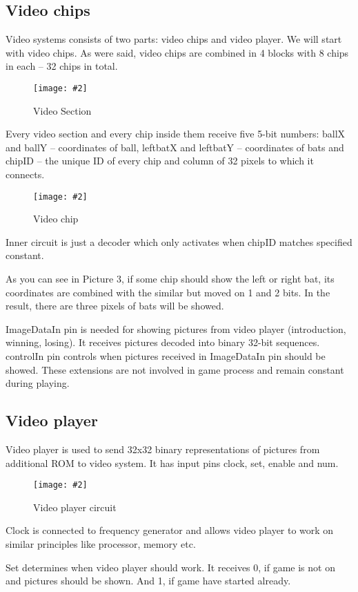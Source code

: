 \documentclass[12pt,a4paper]{article}
\newcommand{\dofigure}[3][H]{
    \begin{figure}[#1]
        \centering
        \texttt{[image: \#2]}
        \caption{#3}
    \end{figure}
}
\begin{document}
    \subsection{Video chips}
    Video systems consists of two parts: video chips and video player. We will start with video chips. As were said, video chips are combined in 4 blocks with 8 chips in each – 32 chips in total. 

    \dofigure{video_section.png}{Video Section}
    Every video section and every chip inside them receive five 5-bit numbers: ballX and ballY – coordinates of ball, leftbatX and leftbatY – coordinates of bats and chipID – the unique ID of every chip and column of 32 pixels to which it connects.
    \dofigure{video_chip.png}{Video chip}

    Inner circuit is just a decoder which only activates when chipID matches specified constant.

    As you can see in Picture 3, if some chip should show the left or right bat, its coordinates are combined with the similar but moved on 1 and 2 bits. In the result, there are three pixels of bats will be showed.
    
    ImageDataIn pin is needed for showing pictures from video player (introduction, winning, losing). It receives pictures decoded into binary 32-bit sequences. controlIn pin controls when pictures received in ImageDataIn pin should be showed. These extensions are not involved in game process and remain constant during playing.

    \subsection{Video player}
    Video player is used to send 32x32 binary representations of pictures from additional ROM to video system. It has input pins clock, set, enable and num.

    \dofigure{video_player.png}{Video player circuit}

    Clock is connected to frequency generator and allows video player to work on similar principles like processor, memory etc.

    Set determines when video player should work. It receives 0, if game is not on and pictures should be shown. And 1, if game have started already.
\end{document}
